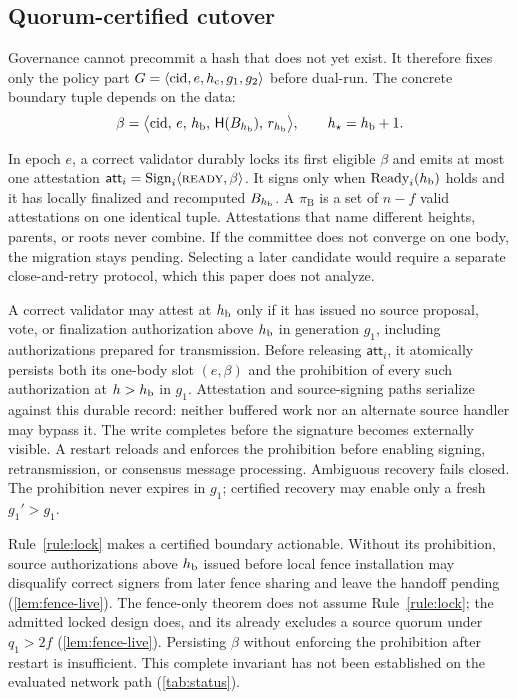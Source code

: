 \subsection{Quorum-certified cutover}
Governance cannot precommit a hash that does not yet exist. It therefore fixes only the policy part
$G=\langle\mathrm{cid},e,h_{\mathrm c},g_1,g_2\rangle$ before dual-run. The concrete boundary tuple depends on
the data:
\begin{equation}
  \beta=\bigl\langle \mathrm{cid},\,e,\,h_{\mathrm b},\,\mathsf{H}(B_{h_{\mathrm b}}),\,r_{h_{\mathrm b}}\bigr\rangle,\qquad h_{\star}=h_{\mathrm b}+1 .
  \label{eq:beta}
\end{equation}

\begin{definition}
\label{def:cutcert}
In epoch $e$, a correct validator durably locks its first eligible $\beta$ and emits at most one
attestation $\mathsf{att}_i=\mathrm{Sign}_i\langle\textsc{ready},\beta\rangle$. It signs only when
$\mathrm{Ready}_i(h_{\mathrm b})$ holds and it has locally finalized and recomputed $B_{h_{\mathrm b}}$. A \CutCert{}
$\pi_{\mathrm B}$ is a set of $n-f$ valid attestations on one identical tuple. Attestations that name
different heights, parents, or roots never combine. If the committee does not converge on one body,
the migration stays pending. Selecting a later candidate would require a separate close-and-retry
protocol, which this paper does not analyze.
\end{definition}

\begin{rulebox}
\label{rule:lock}
A correct validator may attest at $h_{\mathrm b}$ only if it has issued no source proposal, vote, or
finalization authorization above $h_{\mathrm b}$ in generation $g_1$, including authorizations prepared for
transmission. Before releasing $\mathsf{att}_i$, it atomically persists both its one-body slot
$(e,\beta)$ and the prohibition of every such authorization at $h>h_{\mathrm b}$ in $g_1$. Attestation and
source-signing paths serialize against this durable record: neither buffered work nor an alternate
source handler may bypass it. The write completes before the signature becomes externally visible.
A restart reloads and enforces the prohibition before enabling signing, retransmission, or consensus
message processing. Ambiguous recovery fails closed. The prohibition never expires in $g_1$;
certified recovery may enable only a fresh $g_1'>g_1$.
\end{rulebox}

Rule~\ref{rule:lock} makes a certified boundary actionable. Without its prohibition, source
authorizations above $h_{\mathrm b}$ issued before local fence installation may disqualify correct signers
from later fence sharing and leave the handoff pending (\cref{lem:fence-live}). The
fence-only theorem does not assume Rule~\ref{rule:lock}; the admitted locked design does, and its
\CutCert{} already excludes a source quorum under $q_1>2f$ (\cref{lem:fence-live}). Persisting
$\beta$ without enforcing the prohibition after restart is insufficient. This complete invariant
has not been established on the evaluated network path (\cref{tab:status}).

